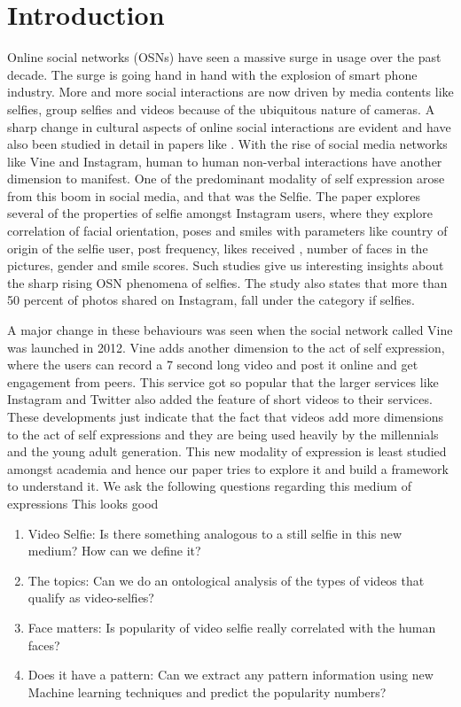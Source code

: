 \section{Introduction}
Online social networks (OSNs) have seen a massive surge in usage over the past decade. The surge is going hand in hand with the explosion of smart phone industry. More and more social interactions are now driven by media contents like selfies, group selfies and videos because of the ubiquitous nature of cameras. A sharp change in cultural aspects of online social interactions are evident and have also been studied in detail in papers like \cite{Souza2015}. 
With the rise of social media networks like Vine and Instagram, human to human non-verbal interactions have another dimension to manifest. One of the predominant modality of self expression arose from this boom in social media, and that was the Selfie. The \cite{Souza2015} paper explores several of the properties of selfie amongst Instagram users, where they explore correlation of facial orientation, poses and smiles with parameters like country of origin of the selfie user, post frequency, likes received , number of faces in the pictures, gender and smile scores. Such studies give us interesting insights about the sharp rising OSN phenomena of selfies. The study also states that more than 50 percent of photos shared on Instagram, fall under the category if selfies. 
\par
A major change in these behaviours was seen when the social network called Vine was launched in 2012. Vine adds another dimension to the act of self expression, where the users can record a 7 second long video and post it online and get engagement from peers. This service got so popular that the larger services like Instagram and Twitter also added the feature of short videos to their services. These developments just indicate that the fact that videos add more dimensions to the act of self expressions and they are being used heavily by the millennials and the young adult generation. This new modality of expression is least studied amongst academia and hence our paper tries to explore it and build a framework to understand it. We ask the following questions regarding this medium of expressions
This looks good

\begin{enumerate}
\item Video Selfie: Is there something analogous to a still selfie in this new medium? How can we define it?
\item The topics: Can we do an ontological analysis of the types of videos that qualify as video-selfies? 
\item Face matters: Is popularity of video selfie really correlated with the human faces? 
\item Does it have a pattern: Can we extract any pattern information using new Machine learning techniques and predict the popularity numbers? 
\end{enumerate}

